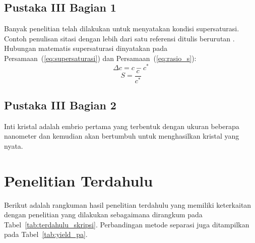 \documentclass[skripsi,laporan]{itkta2025}
\begin{document}
\subsection{Pustaka III Bagian 1}
Banyak penelitian telah dilakukan untuk menyatakan kondisi supersaturasi. Contoh penulisan sitasi dengan lebih dari satu referensi ditulis berurutan \citep{mersmann2001a, mullin2001, jones2002, schwartz2002, tung2009}. Hubungan matematis supersaturasi dinyatakan pada Persamaan~(\ref{eq:supersaturasi}) dan Persamaan~(\ref{eq:rasio_s}):
\begin{equation}
  \Delta c = c - c^*
  \label{eq:supersaturasi}
\end{equation}
\begin{equation}
  S = \frac{c}{c^*}
  \label{eq:rasio_s}
\end{equation}

\subsection{Pustaka III Bagian 2}
Inti kristal adalah embrio pertama yang terbentuk dengan ukuran beberapa nanometer dan kemudian akan bertumbuh untuk menghasilkan kristal yang nyata.

\section{Penelitian Terdahulu}
Berikut adalah rangkuman hasil penelitian terdahulu yang memiliki keterkaitan dengan penelitian yang dilakukan sebagaimana dirangkum pada Tabel~\ref{tab:terdahulu_skripsi}. Perbandingan metode separasi juga ditampilkan pada Tabel~\ref{tab:yield_pa}.
\end{document}
